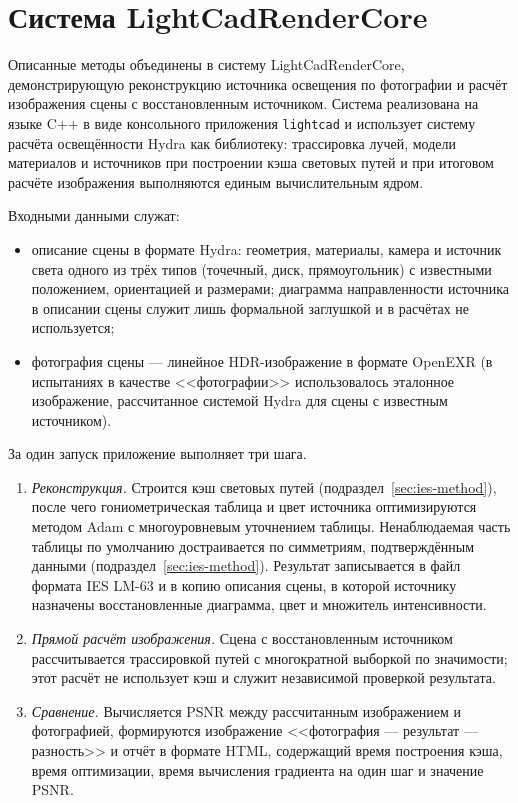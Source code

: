 \section{Система LightCadRenderCore}
\label{sec:lightcad}

Описанные методы объединены в систему LightCadRenderCore, демонстрирующую реконструкцию источника освещения по фотографии и расчёт изображения сцены с восстановленным источником. Система реализована на языке C++ в виде консольного приложения \texttt{lightcad} и использует систему расчёта освещённости Hydra как библиотеку: трассировка лучей, модели материалов и источников при построении кэша световых путей и при итоговом расчёте изображения выполняются единым вычислительным ядром.

Входными данными служат:
\begin{itemize}
    \item описание сцены в формате Hydra: геометрия, материалы, камера и источник света одного из трёх типов (точечный, диск, прямоугольник) с известными положением, ориентацией и размерами; диаграмма направленности источника в описании сцены служит лишь формальной заглушкой и в расчётах не используется;
    \item фотография сцены --- линейное HDR-изображение в формате OpenEXR (в испытаниях в качестве <<фотографии>> использовалось эталонное изображение, рассчитанное системой Hydra для сцены с известным источником).
\end{itemize}

За один запуск приложение выполняет три шага.
\begin{enumerate}
    \item \emph{Реконструкция.} Строится кэш световых путей (подраздел~\ref{sec:ies-method}), после чего гониометрическая таблица и цвет источника оптимизируются методом Adam с многоуровневым уточнением таблицы. Ненаблюдаемая часть таблицы по умолчанию достраивается по симметриям, подтверждённым данными (подраздел~\ref{sec:ies-method}). Результат записывается в файл формата IES LM-63 и в копию описания сцены, в которой источнику назначены восстановленные диаграмма, цвет и множитель интенсивности.
    \item \emph{Прямой расчёт изображения.} Сцена с восстановленным источником рассчитывается трассировкой путей с многократной выборкой по значимости; этот расчёт не использует кэш и служит независимой проверкой результата.
    \item \emph{Сравнение.} Вычисляется PSNR между рассчитанным изображением и фотографией, формируются изображение <<фотография --- результат --- разность>> и отчёт в формате HTML, содержащий время построения кэша, время оптимизации, время вычисления градиента на один шаг и значение PSNR.
\end{enumerate}

